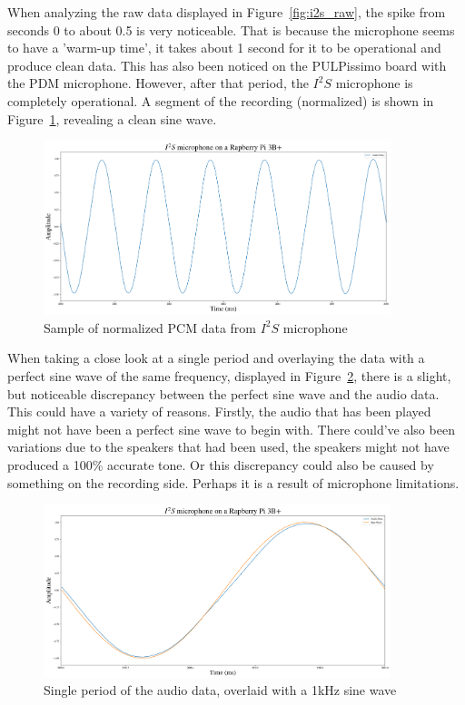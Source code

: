 When analyzing the raw data displayed in Figure~\ref{fig:i2s_raw}, the spike from seconds 0 to about 0.5
is very noticeable. That is because the microphone seems to have a 'warm-up time', it takes about 1 second for it to be operational and produce clean data.
This has also been noticed on the PULPissimo board with the PDM microphone.
However, after that period, the $I^2S$ microphone is completely operational.
A segment of the recording (normalized) is shown in Figure~\ref{fig:i2s_section}, revealing a clean sine wave.

\begin{figure}[H]
    \centering
    \includegraphics[width=0.9\textwidth]{figures/i2s/i2s_data_recording.png}
    \caption[Sample of normalized PCM data from $I^2S$ microphone]{Sample of normalized PCM data from $I^2S$ microphone}
    \label{fig:i2s_section}
\end{figure}

When taking a close look at a single period and overlaying the data with a perfect sine wave of the same
frequency, displayed in Figure~\ref{fig:i2s_period}, there is a slight, but noticeable discrepancy between the perfect sine
wave and the audio data.
This could have a variety of reasons.
Firstly, the audio that has been played might not have been a perfect sine wave to begin with.
There could've also been variations due to the speakers that had been used, the speakers
might not have produced a 100\% accurate tone.
Or this discrepancy could also be caused by something on the recording side.
Perhaps it is a result of microphone limitations.

\begin{figure}[H]
    \centering
    \includegraphics[width=0.9\textwidth]{figures/i2s/i2s_one_period.png}
    \caption[A single period of the normalized audio data, overlaid with a perfect 1kHz sine wave]{Single period of the audio data, overlaid with a 1kHz sine wave}
    \label{fig:i2s_period}
\end{figure}

